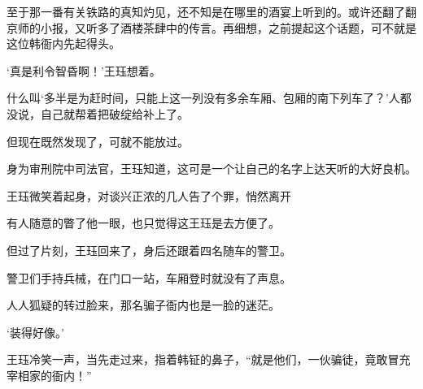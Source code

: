至于那一番有关铁路的真知灼见，还不知是在哪里的酒宴上听到的。或许还翻了翻京师的小报，又听多了酒楼茶肆中的传言。再细想，之前提起这个话题，可不就是这位韩衙内先起得头。

‘真是利令智昏啊！’王珏想着。

什么叫‘多半是为赶时间，只能上这一列没有多余车厢、包厢的南下列车了？'人都没说，自己就帮着把破绽给补上了。

但现在既然发现了，可就不能放过。

身为审刑院中司法官，王珏知道，这可是一个让自己的名字上达天听的大好良机。

王珏微笑着起身，对谈兴正浓的几人告了个罪，悄然离开

有人随意的瞥了他一眼，也只觉得这王珏是去方便了。

但过了片刻，王珏回来了，身后还跟着四名随车的警卫。

警卫们手持兵械，在门口一站，车厢登时就没有了声息。

人人狐疑的转过脸来，那名骗子衙内也是一脸的迷茫。

‘装得好像。’

王珏冷笑一声，当先走过来，指着韩钲的鼻子，“就是他们，一伙骗徒，竟敢冒充宰相家的衙内！”
